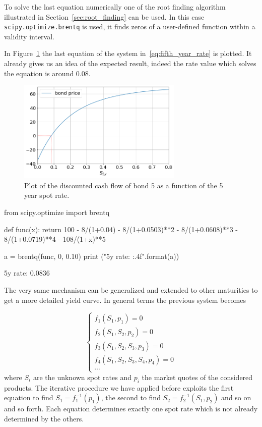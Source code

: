 To solve the last equation numerically one of the root finding algorithm illustrated in Section~\ref{sec:root_finding} can be used. 
In this case \texttt{scipy.optimize.brentq} is used, it finds zeros of a user-defined function within a validity interval.

In Figure~\ref{fig:fifth_year_rate} the last equation of the system in~\ref{eq:fifth_year_rate} is plotted. It already gives us an idea of the expected result, indeed the rate value which solves the equation is around 0.08.

\begin{figure}[htb]
  \centering
  \includegraphics[width=0.7\textwidth]{figures/bond_5_plot.png}
  \caption{Plot of the discounted cash flow of bond 5 as a function of the 5 year spot rate.}
  \label{fig:fifth_year_rate}
\end{figure}

\begin{ipython}
from scipy.optimize import brentq

def func(x):
    return 100 - 8/(1+0.04) - 8/(1+0.0503)**2 - 8/(1+0.0608)**3
               - 8/(1+0.0719)**4 - 108/(1+x)**5
               
a = brentq(func, 0, 0.10)
print ("5y rate: {:.4f}".format(a))
\end{ipython}
\begin{ioutput}
5y rate: 0.0836
\end{ioutput}

The very same mechanism can be generalized and extended to other maturities to get a more detailed yield curve. In general terms the previous system becomes

\begin{equation}
\begin{cases}
f_1(S_1, p_1) = 0 \\
f_2(S_1, S_2, p_2) = 0 \\
f_3(S_1, S_2, S_3, p_3) = 0 \\
f_4(S_1, S_2, S_3, S_4, p_4) = 0 \\
\cdots
\end{cases}
\end{equation}
where $S_i$ are the unknown spot rates and $p_i$ the market quotes of the considered products. The iterative procedure we have applied before exploits the first equation to find $S_1 = f_1^{-1}(p_1)$, the second to find $S_2 = f_2^{-1}(S_1, p_2)$ and so on and so forth. Each equation determines exactly one spot rate which is not already determined by the others.

